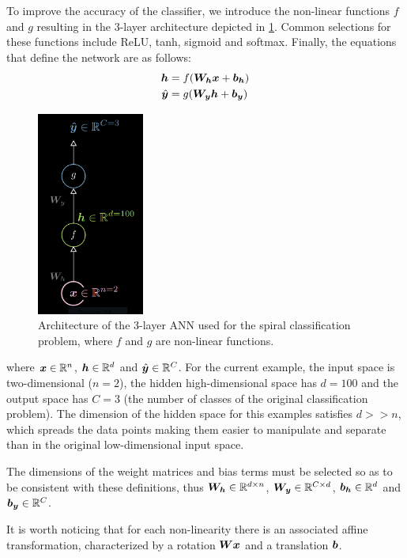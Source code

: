 To improve the accuracy of the classifier, we introduce the non-linear functions $f$ and $g$ resulting in the 3-layer architecture depicted in \cref{fig:3-layer_arch}.
Common selections for these functions include ReLU, tanh, sigmoid and softmax.
Finally, the equations that define the network are as follows:
\begin{align*}
    \vect{h} &= f(\matr{W}_{\vect{h}}\vect{x} + \vect{b}_{\vect{h}}) \\
    \hat{\vect{y}} &= g(\matr{W}_{\vect{y}}\vect{h} + \vect{b}_{\vect{y}})
\end{align*}

\begin{figure}[ht]
    \centering
    \includegraphics[width=100pt]{labs/02/images/architecture.png}
    \caption{Architecture of the 3-layer ANN used for the spiral classification problem, where $f$ and $g$ are non-linear functions.}
    \label{fig:3-layer_arch}
\end{figure}

where $\vect{x} \in \mathbb{R}^n$, $\vect{h} \in \mathbb{R}^d$ and $\hat{\vect{y}} \in \mathbb{R}^C$.
For the current example, the input space is two-dimensional ($n=2$), the hidden high-dimensional space has $d=100$ and the output space has $C=3$ (the number of classes of the original classification problem).
The dimension of the hidden space for this examples satisfies $d >> n$, which spreads the data points making them easier to manipulate and separate than in the original low-dimensional input space.

The dimensions of the weight matrices and bias terms must be selected so as to be consistent with these definitions, thus $\matr{W}_{\vect{h}} \in \mathbb{R}^{d \times n}$, $\matr{W}_{\vect{y}} \in \mathbb{R}^{C \times d}$, $\vect{b}_{\vect{h}} \in \mathbb{R}^d$ and $\vect{b}_{\vect{y}} \in \mathbb{R}^C$.

It is worth noticing that for each non-linearity there is an associated affine transformation, characterized by a rotation $\matr{W}\vect{x}$ and a translation $\vect{b}$.


